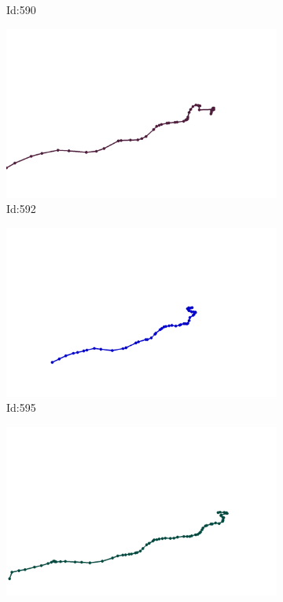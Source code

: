\documentclass[12pt,twoside]{report}
\begin{document}
\begin{figure}
\begin{subfigure}[b]{0.20\textwidth}
\caption{Id:590}
\end{subfigure}
\begin{subfigure}[b]{0.20\textwidth}
\centering
\includegraphics[width=\textwidth]{../trajectories/592.png}
\caption{Id:592}
\end{subfigure}
\begin{subfigure}[b]{0.20\textwidth}
\centering
\includegraphics[width=\textwidth]{../trajectories/595.png}
\caption{Id:595}
\end{subfigure}
\begin{subfigure}[b]{0.20\textwidth}
\centering
\includegraphics[width=\textwidth]{../trajectories/601.png}

\end{subfigure}
\end{figure}
\end{document}
